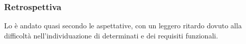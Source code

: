 \subsubsection{Retrospettiva}
Lo  è andato quasi secondo le aspettative, con un leggero ritardo dovuto alla difficoltà nell'individuazione di determinati  e dei requisiti funzionali.\\